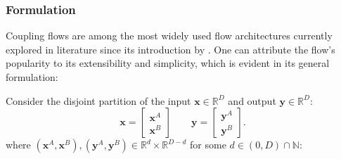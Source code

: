 \subsubsection{Formulation}
Coupling flows are among the most widely used flow architectures currently
explored in literature since its introduction by
\cite{dinhNICENonlinearIndependent2015}. One can attribute the flow's popularity
to its extensibility and simplicity, which is evident in its general
formulation:

Consider the disjoint partition of the input $\mathbf{x} \in
\mathbb{R}^D$ and output $\mathbf{y} \in  \mathbb{R}^D$:
$$
  \mathbf{x} = \begin{bmatrix}
    \mathbf{x}^A \\
    \mathbf{x}^B
  \end{bmatrix} \quad \quad
  \mathbf{y} = \begin{bmatrix}
    \mathbf{y}^A \\
    \mathbf{y}^B
  \end{bmatrix}
.$$
where $(\mathbf{x}^A, \mathbf{x}^B), (\mathbf{y}^A, \mathbf{y}^B)   \in
\mathbb{R}^d \times \mathbb{R}^{D-d}$ for some $d \in (0, D)
\cap \mathbb{N}$:

